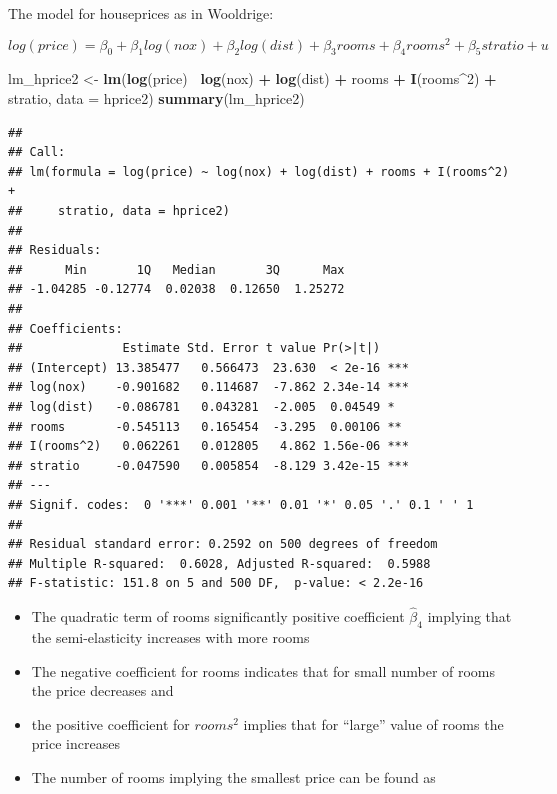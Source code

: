 \documentclass[]{book}
\newenvironment{Shaded}{\begin{snugshade}}{\end{snugshade}}
\newcommand{\DataTypeTok}[1]{\textcolor[rgb]{0.13,0.29,0.53}{#1}}
\newcommand{\DecValTok}[1]{\textcolor[rgb]{0.00,0.00,0.81}{#1}}
\newcommand{\KeywordTok}[1]{\textcolor[rgb]{0.13,0.29,0.53}{\textbf{#1}}}
\newcommand{\NormalTok}[1]{#1}
\newcommand{\OperatorTok}[1]{\textcolor[rgb]{0.81,0.36,0.00}{\textbf{#1}}}
\newcommand{\StringTok}[1]{\textcolor[rgb]{0.31,0.60,0.02}{#1}}
\providecommand{\tightlist}{%
  \setlength{\itemsep}{0pt}\setlength{\parskip}{0pt}}
\begin{document}
The model for houseprices as in Wooldrige:

\begin{equation}
log(price) = \beta_0 +  \beta_1 log(nox) + \beta_2 log(dist) + \beta_3 rooms + \beta_4 rooms^{2} + \beta_5 stratio + u 
\end{equation}

\begin{Shaded}
\begin{Highlighting}[]
\NormalTok{lm_hprice2 <-}\StringTok{ }\KeywordTok{lm}\NormalTok{(}\KeywordTok{log}\NormalTok{(price)}\OperatorTok{~}\StringTok{  }\KeywordTok{log}\NormalTok{(nox) }\OperatorTok{+}\StringTok{  }\KeywordTok{log}\NormalTok{(dist) }\OperatorTok{+}\StringTok{ }\NormalTok{rooms }\OperatorTok{+}\StringTok{ }\KeywordTok{I}\NormalTok{(rooms}\OperatorTok{^}\DecValTok{2}\NormalTok{) }\OperatorTok{+}\StringTok{ }\NormalTok{stratio, }\DataTypeTok{data =}\NormalTok{ hprice2)}
\KeywordTok{summary}\NormalTok{(lm_hprice2)}
\end{Highlighting}
\end{Shaded}

\begin{verbatim}
## 
## Call:
## lm(formula = log(price) ~ log(nox) + log(dist) + rooms + I(rooms^2) + 
##     stratio, data = hprice2)
## 
## Residuals:
##      Min       1Q   Median       3Q      Max 
## -1.04285 -0.12774  0.02038  0.12650  1.25272 
## 
## Coefficients:
##              Estimate Std. Error t value Pr(>|t|)    
## (Intercept) 13.385477   0.566473  23.630  < 2e-16 ***
## log(nox)    -0.901682   0.114687  -7.862 2.34e-14 ***
## log(dist)   -0.086781   0.043281  -2.005  0.04549 *  
## rooms       -0.545113   0.165454  -3.295  0.00106 ** 
## I(rooms^2)   0.062261   0.012805   4.862 1.56e-06 ***
## stratio     -0.047590   0.005854  -8.129 3.42e-15 ***
## ---
## Signif. codes:  0 '***' 0.001 '**' 0.01 '*' 0.05 '.' 0.1 ' ' 1
## 
## Residual standard error: 0.2592 on 500 degrees of freedom
## Multiple R-squared:  0.6028, Adjusted R-squared:  0.5988 
## F-statistic: 151.8 on 5 and 500 DF,  p-value: < 2.2e-16
\end{verbatim}

\begin{itemize}
\tightlist
\item
  The quadratic term of rooms significantly positive coefficient
  \(\hat\beta_4\) implying that the semi-elasticity increases with more
  rooms
\item
  The negative coefficient for rooms indicates that for small number of
  rooms the price decreases and
\item
  the positive coefficient for \(rooms^2\) implies that for ``large''
  value of rooms the price increases
\item
  The number of rooms implying the smallest price can be found as
\end{itemize}
\end{document}
